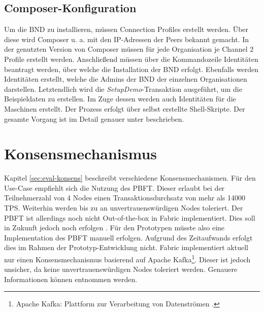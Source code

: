 \subsection{Composer-Konfiguration}
Um die \acs{BND} zu installieren, müssen Connection Profiles erstellt werden. Über diese wird Composer u. a. mit den IP-Adressen der Peers bekannt gemacht. In der genutzten Version von Composer müssen für jede Organisation je Channel 2 Profile erstellt werden. Anschließend müssen über die Kommandozeile Identitäten beantragt werden, über welche die Installation der \acs{BND} erfolgt. Ebenfalls werden Identitäten erstellt, welche die Admins der \acs{BND} der einzelnen Organisationen darstellen. Letztendlich wird die \textit{SetupDemo}-Transaktion ausgeführt, um die Beispieldaten zu erstellen. Im Zuge dessen werden auch Identitäten für die Maschinen erstellt. Der Prozess erfolgt über selbst erstellte Shell-Skripte. Der gesamte Vorgang ist im Detail genauer unter \cite{HyperledgerComposerTeamMultiOrgDeployment} beschrieben.

\section{Konsensmechanismus}
\label{sec:consensus-choose}
Kapitel \ref{sec:eval-konsens} beschreibt verschiedene Konsensmechanismen. Für den Use-Case empfiehlt sich die Nutzung des \acs{PBFT}. Dieser erlaubt bei der Teilnehmerzahl von 4 Nodes einen Transaktionsdurchsatz von mehr als 14000 \acs{TPS}. Weiterhin werden bis zu  an unvertrauenswürdigen Nodes toleriert. Der \acs{PBFT} ist allerdings noch nicht Out-of-the-box in Fabric implementiert. Dies soll in Zukunft jedoch noch erfolgen \cite{HyperledgerFabricTeamPluggableConsensusImplementations}. Für den Prototypen müsste also eine Implementation des \acs{PBFT} manuell erfolgen. Aufgrund des Zeitaufwands erfolgt dies im Rahmen der Prototyp-Entwicklung nicht. Fabric implementiert aktuell nur einen Konsensmechanismus basierend auf Apache Kafka\footnote{Apache Kafka: Plattform zur Verarbeitung von Datenströmen \cite{ApacheIntroductionApacheKafka}.}. Dieser ist jedoch unsicher, da keine unvertrauenswürdigen Nodes toleriert werden. Genauere Informationen können \cite{CachinBlockchainConsensusProtocols2017} entnommen werden.

